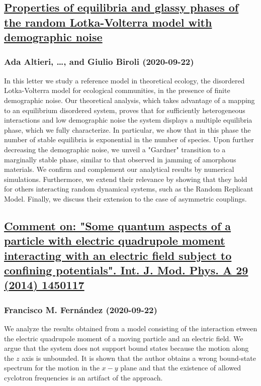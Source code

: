 {\subsection*{\href{http://arxiv.org/abs/2009.10565v1}{Properties of equilibria and glassy phases of the random Lotka-Volterra  model with demographic noise}}
\subsubsection*{Ada Altieri, \dots, and Giulio Biroli (2020-09-22)}
In this letter we study a reference model in theoretical ecology, the
disordered Lotka-Volterra model for ecological communities, in the presence of
finite demographic noise. Our theoretical analysis, which takes advantage of a
mapping to an equilibrium disordered system, proves that for sufficiently
heterogeneous interactions and low demographic noise the system displays a
multiple equilibria phase, which we fully characterize. In particular, we show
that in this phase the number of stable equilibria is exponential in the number
of species. Upon further decreasing the demographic noise, we unveil a
"Gardner" transition to a marginally stable phase, similar to that observed in
jamming of amorphous materials. We confirm and complement our analytical
results by numerical simulations. Furthermore, we extend their relevance by
showing that they hold for others interacting random dynamical systems, such as
the Random Replicant Model. Finally, we discuss their extension to the case of
asymmetric couplings.

\subsection*{\href{http://arxiv.org/abs/2009.10561v1}{Comment on: "Some quantum aspects of a particle with electric quadrupole  moment interacting with an electric field subject to confining potentials".  Int. J. Mod. Phys. A 29 (2014) 1450117}}
\subsubsection*{Francisco M. Fernández (2020-09-22)}
We analyze the results obtained from a model consisting of the interaction
etween the electric quadrupole moment of a moving particle and an electric
field. We argue that the system does not support bound states because the
motion along the $z$ axis is unbounded. It is shown that the author obtains a
wrong bound-state spectrum for the motion in the $x-y$ plane and that the
existence of allowed cyclotron frequencies is an artifact of the approach.

}
